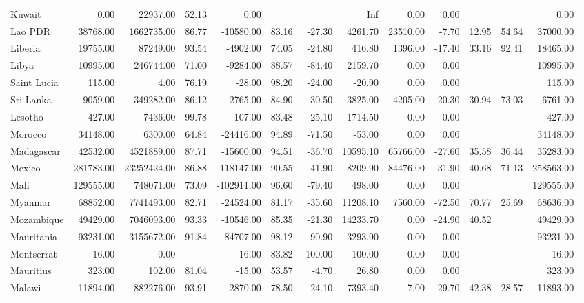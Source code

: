 \begin{table}[ht]
\begin{tabular}{lrrrrrrrrrrrr}
  Kuwait & 0.00 & 22937.00 & 52.13 & 0.00 &  &  & Inf & 0.00 & 0.00 &  &  & 0.00 \\ 
  Lao PDR & 38768.00 & 1662735.00 & 86.77 & -10580.00 & 83.16 & -27.30 & 4261.70 & 23510.00 & -7.70 & 12.95 & 54.64 & 37000.00 \\ 
  Liberia & 19755.00 & 87249.00 & 93.54 & -4902.00 & 74.05 & -24.80 & 416.80 & 1396.00 & -17.40 & 33.16 & 92.41 & 18465.00 \\ 
  Libya & 10995.00 & 246744.00 & 71.00 & -9284.00 & 88.57 & -84.40 & 2159.70 & 0.00 & 0.00 &  &  & 10995.00 \\ 
  Saint Lucia & 115.00 & 4.00 & 76.19 & -28.00 & 98.20 & -24.00 & -20.90 & 0.00 & 0.00 &  &  & 115.00 \\ 
  Sri Lanka & 9059.00 & 349282.00 & 86.12 & -2765.00 & 84.90 & -30.50 & 3825.00 & 4205.00 & -20.30 & 30.94 & 73.03 & 6761.00 \\ 
  Lesotho & 427.00 & 7436.00 & 99.78 & -107.00 & 83.48 & -25.10 & 1714.50 & 0.00 & 0.00 &  &  & 427.00 \\ 
  Morocco & 34148.00 & 6300.00 & 64.84 & -24416.00 & 94.89 & -71.50 & -53.00 & 0.00 & 0.00 &  &  & 34148.00 \\ 
  Madagascar & 42532.00 & 4521889.00 & 87.71 & -15600.00 & 94.51 & -36.70 & 10595.10 & 65766.00 & -27.60 & 35.58 & 36.44 & 35283.00 \\ 
  Mexico & 281783.00 & 23252424.00 & 86.88 & -118147.00 & 90.55 & -41.90 & 8209.90 & 84476.00 & -31.90 & 40.68 & 71.13 & 258563.00 \\ 
  Mali & 129555.00 & 748071.00 & 73.09 & -102911.00 & 96.60 & -79.40 & 498.00 & 0.00 & 0.00 &  &  & 129555.00 \\ 
  Myanmar & 68852.00 & 7741493.00 & 82.71 & -24524.00 & 81.17 & -35.60 & 11208.10 & 7560.00 & -72.50 & 70.77 & 25.69 & 68636.00 \\ 
  Mozambique & 49429.00 & 7046093.00 & 93.33 & -10546.00 & 85.35 & -21.30 & 14233.70 & 0.00 & -24.90 & 40.52 &  & 49429.00 \\ 
  Mauritania & 93231.00 & 3155672.00 & 91.84 & -84707.00 & 98.12 & -90.90 & 3293.90 & 0.00 & 0.00 &  &  & 93231.00 \\ 
  Montserrat & 16.00 & 0.00 &  & -16.00 & 83.82 & -100.00 & -100.00 & 0.00 & 0.00 &  &  & 16.00 \\ 
  Mauritius & 323.00 & 102.00 & 81.04 & -15.00 & 53.57 & -4.70 & 26.80 & 0.00 & 0.00 &  &  & 323.00 \\ 
  Malawi & 11894.00 & 882276.00 & 93.91 & -2870.00 & 78.50 & -24.10 & 7393.40 & 7.00 & -29.70 & 42.38 & 28.57 & 11893.00 \\ 

\end{tabular}
\end{table}
